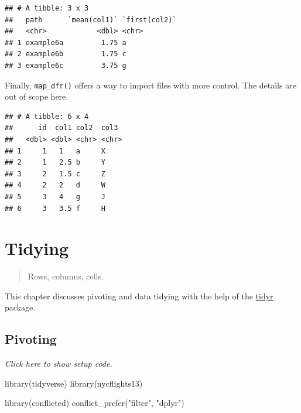 \documentclass[]{book}
\newenvironment{Shaded}{}{}
\newcommand{\KeywordTok}[1]{\textcolor[rgb]{0.00,0.00,1.00}{#1}}
\newcommand{\NormalTok}[1]{#1}
\newcommand{\OperatorTok}[1]{#1}
\newcommand{\StringTok}[1]{\textcolor[rgb]{0.00,0.50,0.50}{#1}}
\begin{document}
\begin{verbatim}
## # A tibble: 3 x 3
##   path      `mean(col1)` `first(col2)`
##   <chr>            <dbl> <chr>        
## 1 example6a         1.75 a            
## 2 example6b         1.75 c            
## 3 example6c         3.75 g
\end{verbatim}

Finally, \texttt{map\_dfr()} offers a way to import files with more control.
The details are out of scope here.

\begin{Shaded}
\end{Shaded}

\begin{verbatim}
## # A tibble: 6 x 4
##      id  col1 col2  col3 
##   <dbl> <dbl> <chr> <chr>
## 1     1   1   a     X    
## 2     1   2.5 b     Y    
## 3     2   1.5 c     Z    
## 4     2   2   d     W    
## 5     3   4   g     J    
## 6     3   3.5 f     H
\end{verbatim}

\hypertarget{tidying}{%
\chapter{Tidying}\label{tidying}}

\begin{quote}
Rows, columns, cells.
\end{quote}

This chapter discusses pivoting and data tidying with the help of the \href{https://tidyr.tidyverse.org/}{tidyr} package.

\hypertarget{pivoting}{%
\section{Pivoting}\label{pivoting}}

\emph{Click here to show setup code.}

\begin{Shaded}
\begin{Highlighting}[]
\KeywordTok{library}\NormalTok{(tidyverse)}
\KeywordTok{library}\NormalTok{(nycflights13)}

\KeywordTok{library}\NormalTok{(conflicted)}
\KeywordTok{conflict_prefer}\NormalTok{(}\StringTok{"filter"}\NormalTok{, }\StringTok{"dplyr"}\NormalTok{)}
\end{Highlighting}
\end{Shaded}
\end{document}
